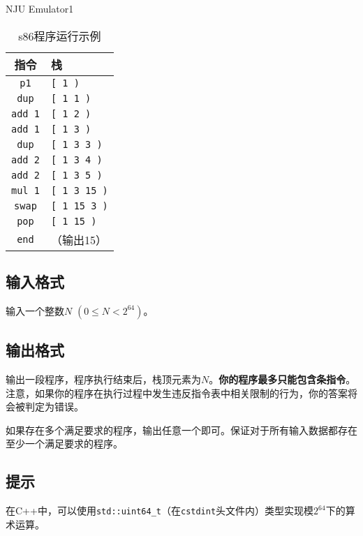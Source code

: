 \begin{Problem}{NJU Emulator}{1}
\begin{table}[htbp]
\centering
\begin{tabular}{cl}
\hline
指令 & 栈  \\ \hline
\texttt{p1} & \texttt{[ 1 )} \\ 
\texttt{dup} & \texttt{[ 1 1 )} \\
\texttt{add 1} & \texttt{[ 1 2 )} \\
\texttt{add 1} & \texttt{[ 1 3 )} \\
\texttt{dup} & \texttt{[ 1 3 3 )} \\
\texttt{add 2} & \texttt{[ 1 3 4 )} \\
\texttt{add 2} & \texttt{[ 1 3 5 )} \\
\texttt{mul 1} & \texttt{[ 1 3 15 )} \\
\texttt{swap} & \texttt{[ 1 15 3 )} \\
\texttt{pop} & \texttt{[ 1 15 )} \\
\texttt{end} & （输出15） \\ \hline
\end{tabular}
\caption{s86程序运行示例}
\end{table}

\subsection*{输入格式}

输入一个整数$N$ $(0 \leq N < 2^{64})$。

\subsection*{输出格式}

输出一段程序，程序执行结束后，栈顶元素为$N$。\textbf{你的程序最多只能包含条指令}。注意，如果你的程序在执行过程中发生违反指令表中相关限制的行为，你的答案将会被判定为错误。

如果存在多个满足要求的程序，输出任意一个即可。保证对于所有输入数据都存在至少一个满足要求的程序。

\setcounter{ExampleNo}{0}


\subsection*{提示}

在C++中，可以使用\verb|std::uint64_t|（在\texttt{cstdint}头文件内）类型实现模$2^{64}$下的算术运算。

\end{Problem}

